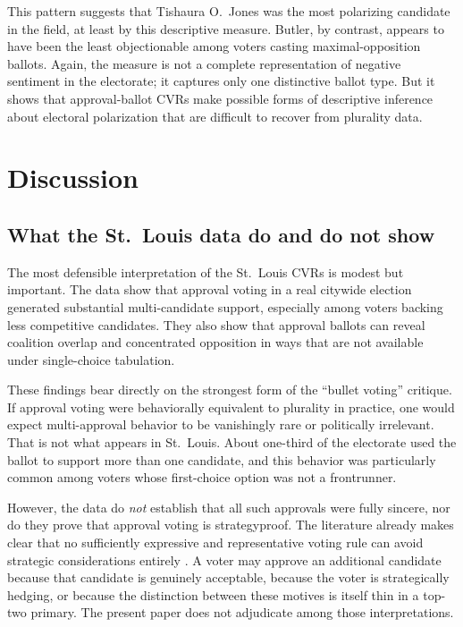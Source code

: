 \documentclass[11pt]{article}
\begin{document}
This pattern suggests that Tishaura O.~Jones was the most polarizing candidate in the field, at least by this descriptive measure. Butler, by contrast, appears to have been the least objectionable among voters casting maximal-opposition ballots. Again, the measure is not a complete representation of negative sentiment in the electorate; it captures only one distinctive ballot type. But it shows that approval-ballot CVRs make possible forms of descriptive inference about electoral polarization that are difficult to recover from plurality data.

\section{Discussion}
\subsection{What the St.~Louis data do and do not show}
The most defensible interpretation of the St.~Louis CVRs is modest but important. The data show that approval voting in a real citywide election generated substantial multi-candidate support, especially among voters backing less competitive candidates. They also show that approval ballots can reveal coalition overlap and concentrated opposition in ways that are not available under single-choice tabulation.

These findings bear directly on the strongest form of the ``bullet voting'' critique. If approval voting were behaviorally equivalent to plurality in practice, one would expect multi-approval behavior to be vanishingly rare or politically irrelevant. That is not what appears in St.~Louis. About one-third of the electorate used the ballot to support more than one candidate, and this behavior was particularly common among voters whose first-choice option was not a frontrunner.

However, the data do \emph{not} establish that all such approvals were fully sincere, nor do they prove that approval voting is strategyproof. The literature already makes clear that no sufficiently expressive and representative voting rule can avoid strategic considerations entirely \citep{brams2007approval, brams2022excess}. A voter may approve an additional candidate because that candidate is genuinely acceptable, because the voter is strategically hedging, or because the distinction between these motives is itself thin in a top-two primary. The present paper does not adjudicate among those interpretations.
\end{document}
